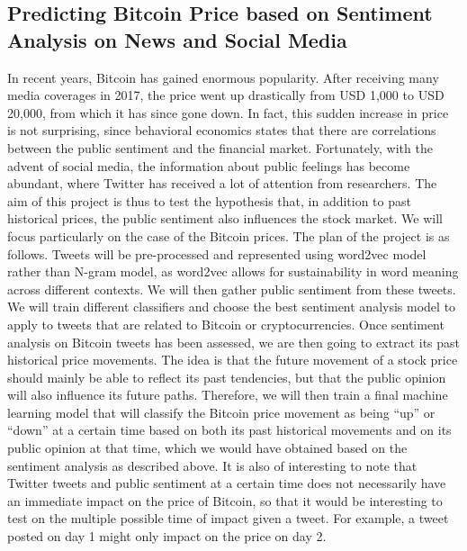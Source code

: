 \documentclass[12pt,a4paper]{report}
\begin{document}
\subsection*{Predicting Bitcoin Price based on Sentiment Analysis on News and Social Media}
\par \qquad In recent years, Bitcoin has gained enormous popularity. After receiving many media coverages in 2017, the price went up drastically from USD 1,000 to USD 20,000, from which it has since gone down. In fact, this sudden increase in price is not surprising, since behavioral economics states that there are correlations between the public sentiment and the financial market. Fortunately, with the advent of social media, the information about public feelings has become abundant, where Twitter has received a lot of attention from researchers. The aim of this project is thus to test the hypothesis that, in addition to past historical prices, the public sentiment also influences the stock market. We will focus particularly on the case of the Bitcoin prices. The plan of the project is as follows. Tweets will be pre-processed and represented using word2vec model rather than N-gram model, as word2vec allows for sustainability in word meaning across different contexts. We will then gather public sentiment from these tweets. We will train different classifiers and choose the best sentiment analysis model to apply to tweets that are related to Bitcoin or cryptocurrencies. Once sentiment analysis on Bitcoin tweets has been assessed, we are then going to extract its past historical price movements. The idea is that the future movement of a stock price should mainly be able to reflect its past tendencies, but that the public opinion will also influence its future paths. Therefore, we will then train a final machine learning model that will classify the Bitcoin price movement as being ``up'' or ``down'' at a certain time based on both its past historical movements and on its public opinion at that time, which we would have obtained based on the sentiment analysis as described above. It is also of interesting to note that Twitter tweets and public sentiment at a certain time does not necessarily have an immediate impact on the price of Bitcoin, so that it would be interesting to test on the multiple possible time of impact  given a tweet. For example, a tweet posted on day 1 might only impact on the price on day 2. 
\\
\end{document}
